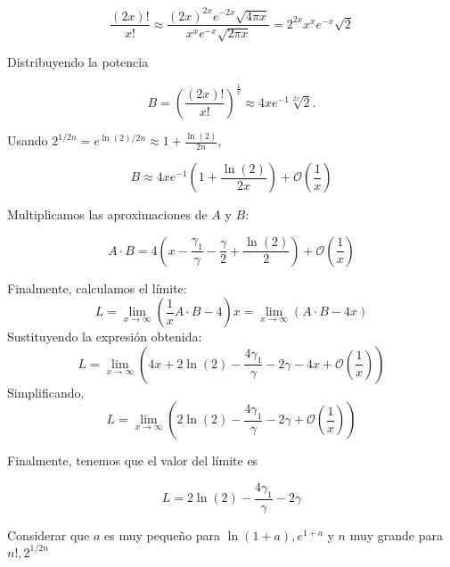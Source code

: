 {\[
\frac{(2x)!}{x!} \approx \frac{(2x)^{2x} e^{-2x} \sqrt{4\pi x}}{x^x e^{-x} \sqrt{2\pi x}} = 2^{2x} x^x e^{-x} \sqrt{2}
\]

Distribuyendo la potencia

\[
B = \left( \frac{(2x)!}{x!} \right)^{\frac{1}{x}} \approx 4 x e^{-1} \sqrt[2x]{2}.
\]

Usando $2^{1/2n} =e^{\ln(2)/2n}\approx 1 + \frac{\ln(2)}{2n}$,

\[
B \approx 4 x e^{-1} \left(1 + \frac{\ln(2)}{2x}\right) + \mathcal{O}\left(\frac{1}{x}\right)
\]

Multiplicamos las aproximaciones de $A$ y $B$:

\[
A \cdot B = 4 \left(x - \frac{\gamma_1}{\gamma} - \frac{\gamma}{2} + \frac{\ln(2)}{2}\right) + \mathcal{O}\left(\frac{1}{x}\right)
\]

Finalmente, calculamos el límite:
\[
L=\lim_{x \to \infty} \left(\frac{1}{x} A \cdot B - 4 \right)x = \lim_{x \to \infty} \left(A \cdot B - 4x \right)
\]
Sustituyendo la expresión obtenida:
\[
L=\lim_{x \to \infty} \left(4x + 2 \ln(2) - \frac{4 \gamma_1}{\gamma} - 2 \gamma - 4x + \mathcal{O}\left(\frac{1}{x}\right) \right)
\]
Simplificando,
\[
L=\lim_{x \to \infty} \left( 2 \ln(2) - \frac{4 \gamma_1}{\gamma} - 2 \gamma +\mathcal{O}\left(\frac{1}{x}\right)\right)
\]
}

Finalmente, tenemos que el valor del límite es
\begin{LnxRptaBox}
	\[
	L=  2\ln(2)- \frac{4 \gamma_1}{\gamma} - 2 \gamma
	\]
\end{LnxRptaBox}

\vspace{1.4cm}
{\large   * Considerar que $a$ es muy pequeño para $\ln(1+a), e^{1+a}$ y $n$ muy grande para $ n!, 2^{1/2n}$}
